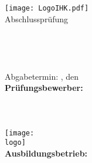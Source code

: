 \thispagestyle{plain}
\begin{titlepage}

\begin{center}
\texttt{[image: LogoIHK.pdf]}\\[1ex]
\Large{Abschlussprüfung \pruefungstermin}\\[3ex]

\Large{\ausbildungsberuf}\\
\LARGE{\betreff}\\[4ex]

\huge{\textbf{\titel}}\\[1.5ex]
\Large{\textbf{\untertitel}}\\[4ex]

\normalsize
Abgabetermin: \ort, den \abgabetermin\\[3em]
\textbf{Prüfungsbewerber:}\\
\autor\\
\autorStrasse\\
\autorOrt\\[5ex]

\texttt{[image: \\logo]}\\ %
\textbf{Ausbildungsbetrieb:}\\
\textsc{\betriebName} \betriebSubName\\
\betriebStrasse\\
\betriebOrt\\[5em]
\end{center}


\end{titlepage}